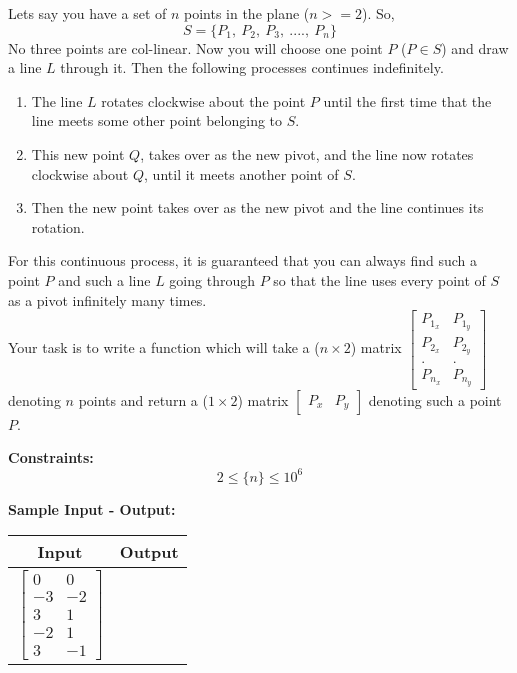 \documentclass[11pt,paper=a4,answers]{exam}
\begin{document}
\begin{questions}
\droppoints
\newpage

\question[10]
\label{Q:zbus}
Lets say you have a set of $n$ points in the plane ($n >= 2$). So,
$$S = \{P_1,\ P_2,\ P_3,\ ....,\ P_n\}$$ No three points are col-linear. Now you will choose one point $P$ ($P \in S$) and draw a line $L$ through it. Then the following processes continues indefinitely.
\begin{enumerate}
\item The line $L$ rotates clockwise about the point $P$ until the first time that the line meets some other point belonging to $S$.
\item This new point $Q$, takes over as the new pivot, and the line now rotates clockwise about $Q$, until it meets another point of $S$.
\item Then the new point takes over as the new pivot and the line continues its rotation.
\end{enumerate}
For this continuous process, it is guaranteed that you can always find such a point $P$ and such a line $L$ going through $P$ so that the line uses every point of $S$ as a pivot infinitely many times.\\

Your task is to write a function which will take a ($n \times 2$) matrix  $
\begin{bmatrix}
P_{1_x} & P_{1_y}\\
P_{2_x} & P_{2_y}\\
. & .\\
P_{n_x} & P_{n_y}
\end{bmatrix}
$  denoting $n$ points  and return a ($1 \times 2$) matrix  $
\begin{bmatrix}
P_x & P_y
\end{bmatrix}
$  denoting such a point $P$.

\textbf{ Constraints:} 
$$ 2 \leq \{ n \} \leq 10^6$$

\textbf{ Sample Input - Output:}\\
\begin{center}
\begin{tabular}{|c|c|}
\hline
\textbf{Input} & \textbf{Output}\\
\hline
$
\begin{bmatrix}
0 & 0\\
-3 & -2\\
3 & 1\\
-2 & 1\\
3 & -1
\end{bmatrix}
$
 & 
 

\end{tabular}
\end{center}
\end{questions}
\end{document}
